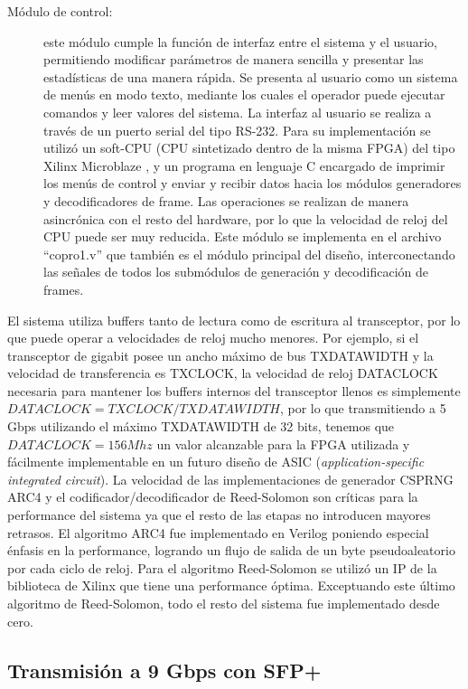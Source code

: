 \begin{description}
 \item[Módulo de control:] este módulo cumple la función de interfaz entre el sistema y el usuario, permitiendo modificar parámetros de manera sencilla y presentar las estadísticas de una manera rápida. Se presenta al usuario como un sistema de menús en modo texto, mediante los cuales el operador puede ejecutar comandos y leer valores del sistema. La interfaz al usuario se realiza a través de un puerto serial del tipo RS-232. Para su implementación se utilizó un soft-CPU (CPU sintetizado dentro de la misma FPGA) del tipo Xilinx Microblaze \cite{Xilinx:DS865}, y un programa en lenguaje C encargado de imprimir los menús de control y enviar y recibir datos hacia los módulos generadores y decodificadores de frame. Las operaciones se realizan de manera asincrónica con el resto del hardware, por lo que la velocidad de reloj del CPU puede ser muy reducida. Este módulo se implementa en el archivo ``copro1.v'' que también es el módulo principal del diseño, interconectando las señales de todos los submódulos de generación y decodificación de frames.
\end{description}

El sistema utiliza buffers tanto de lectura como de escritura al transceptor, por lo que puede operar a velocidades de reloj mucho menores. Por ejemplo, si el transceptor de gigabit posee un ancho máximo de bus TXDATAWIDTH y la velocidad de transferencia es TXCLOCK, la velocidad de reloj DATACLOCK necesaria para mantener los buffers internos del transceptor llenos es simplemente $DATACLOCK=TXCLOCK/TXDATAWIDTH$, por lo que transmitiendo a 5 Gbps utilizando el máximo TXDATAWIDTH de 32 bits, tenemos que $DATACLOCK=156Mhz$ un valor alcanzable para la FPGA utilizada y fácilmente implementable en un futuro diseño de ASIC (\textit{application-specific integrated circuit}).
La velocidad de las implementaciones de generador CSPRNG ARC4 y el codificador/decodificador de Reed-Solomon son críticas para la performance del sistema ya que el resto de las etapas no introducen mayores retrasos. El algoritmo ARC4 fue implementado en Verilog poniendo especial énfasis en la performance, logrando un flujo de salida de un byte pseudoaleatorio por cada ciclo de reloj. Para el algoritmo Reed-Solomon se utilizó un IP de la biblioteca de Xilinx que tiene una performance óptima. Exceptuando este último algoritmo de Reed-Solomon, todo el resto del sistema fue implementado desde cero.


\subsection{Transmisión a 9 Gbps con SFP+}

